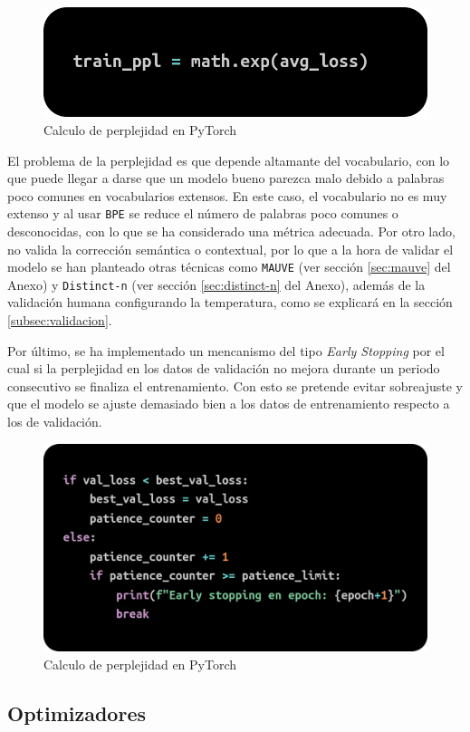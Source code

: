\documentclass[11pt]{book}
\begin{document}
\begin{figure}[h]
    \centering
    \includegraphics[width=0.5\linewidth]{img/perplexity.png}
    \caption{Calculo de perplejidad en PyTorch \parencite{stackoverflow_perplexity_pytorch}}
    \label{fig:placeholder21}
\end{figure}

El problema de la perplejidad \parencite{singh2024perplexitymatters} es que depende altamante del vocabulario, con lo que puede llegar a darse que un modelo bueno parezca malo debido a palabras poco comunes en vocabularios extensos. En este caso, el vocabulario no es muy extenso y al usar \texttt{BPE} se reduce el número de palabras poco comunes o desconocidas, con lo que se ha considerado una métrica adecuada. Por otro lado, no valida la corrección semántica o contextual, por lo que a la hora de validar el modelo se han planteado otras técnicas como \texttt{MAUVE} \parencite{krishnap25_mauve_github} (ver sección \ref{sec:mauve} del Anexo) y \texttt{Distinct-n} (ver sección \ref{sec:distinct-n} del Anexo), además de la validación humana configurando la temperatura, como se explicará en la sección \ref{subsec:validacion}.

Por último, se ha implementado un mencanismo del tipo \textit{Early Stopping} por el cual si la perplejidad en los datos de validación no mejora durante un periodo consecutivo se finaliza el entrenamiento. Con esto se pretende evitar sobreajuste y que el modelo se ajuste demasiado bien a los datos de entrenamiento respecto a los de validación.

\begin{figure}[h]
    \centering
    \includegraphics[width=0.5\linewidth]{img/early_stop.png}
    \caption{Calculo de perplejidad en PyTorch \parencite{stackoverflow_perplexity_pytorch}}
    \label{fig:placeholder23}
\end{figure}

\subsection{Optimizadores}
\end{document}
